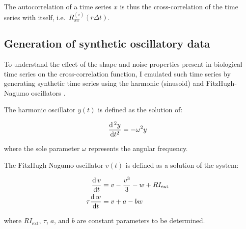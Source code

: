 The autocorrelation of a time series $x$ is thus the cross-correlation of the time series with itself, i.e.\ $R_{xx}^{(i)}(r \Delta t)$.


\subsection{Generation of synthetic oscillatory data}
\label{subsec:methods-computational-synthetic}

To understand the effect of the shape and noise properties present in biological time series on the cross-correlation function, I emulated such time series by generating synthetic time series using the harmonic (sinusoid) and FitzHugh-Nagumo oscillators \parencite{fitzhughImpulsesPhysiologicalStates1961}.

The harmonic oscillator $y(t)$ is defined as the solution of:

\begin{equation}
  \frac{\mathrm{d} \,^{2} y}{\mathrm{d} t^{2}} = -\omega^{2}y
  \label{eq:harmonic}
\end{equation}

where the sole parameter $\omega$ represents the angular frequency.



The FitzHugh-Nagumo oscillator $v(t)$ is defined as a solution of the system:

\begin{equation}
  \begin{aligned}
    \frac{\mathrm{d} \, v}{\mathrm{d} t} &= v - \frac{v^3}{3} - w + RI_{\mathrm{ext}} \\
    \tau \frac{\mathrm{d} \, w}{\mathrm{d} t} &= v + a - bw
  \end{aligned}
  \label{eq:fhn}
\end{equation}

where $RI_{\mathrm{ext}}$, $\tau$, $a$, and $b$ are constant parameters to be determined.

